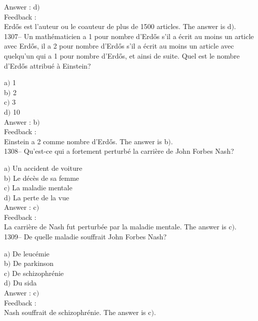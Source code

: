 ﻿\documentclass[letterpaper, 12pt]{article}
\begin{document}
Answer : d$)$\\

Feedback : \\
Erd\H{o}s est l'auteur ou le coauteur de plus de 1500 articles.
The answer is  d$)$.\\

1307-- Un math\'ematicien a 1 pour nombre d'Erd\H{o}s s'il a \'ecrit
au moins un article avec Erd\H{o}s, il a 2 pour nombre d'Erd\H{o}s
s'il a \'ecrit au moins un article avec quelqu'un qui a 1 pour
nombre d'Erd\H{o}s, et ainsi de suite. Quel est le nombre
d'Erd\H{o}s attribu\'e \`a Einstein?

a$)$ 1 \\
b$)$ 2 \\
c$)$ 3 \\
d$)$ 10\\

Answer : b$)$\\

Feedback : \\
Einstein a 2 comme nombre d'Erd\H{o}s.
The answer is  b$)$.\\

1308-- Qu'est-ce qui a fortement perturb\'e la carri\`ere de John
Forbes Nash?

a$)$ Un accident de voiture \\
b$)$ Le d\'ec\`es de sa femme \\
c$)$ La maladie mentale \\
d$)$ La perte de la vue\\

Answer : c$)$\\

Feedback : \\
La carri\`ere de Nash fut perturb\'ee par la maladie mentale.
The answer is  c$)$.\\

1309-- De quelle maladie souffrait John Forbes Nash?

a$)$ De leuc\'emie \\
b$)$ De parkinson \\
c$)$ De schizophr\'enie \\
d$)$ Du sida\\

Answer : c$)$\\

Feedback : \\
Nash souffrait de schizophr\'enie.
The answer is  c$)$.\\
\end{document}
